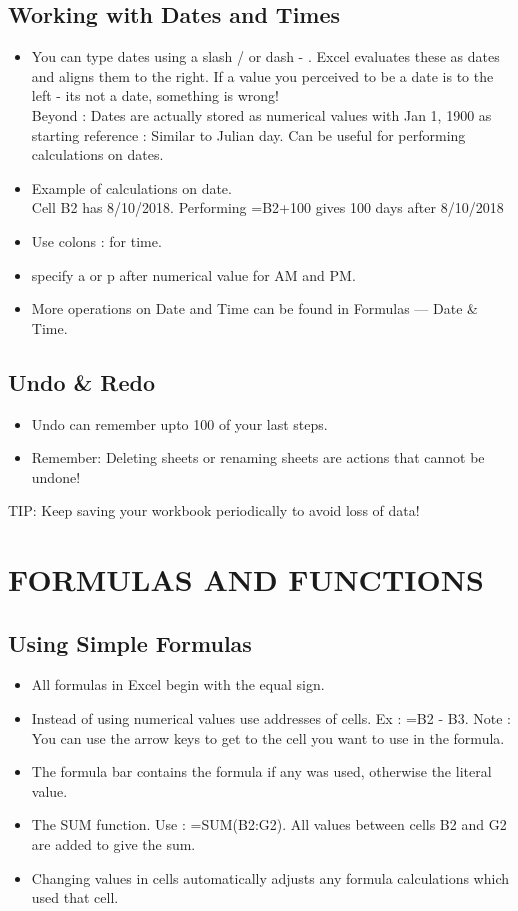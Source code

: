 \documentclass[11pt, oneside]{article}   	%
\begin{document}
\subsection{Working with Dates and Times}
\begin{itemize}
\item You can type dates using a slash / or dash - . Excel evaluates these as dates and aligns them to the right. If a value you perceived to be a date is to the left - its not a date, something is wrong!
\bigskip \\
 Beyond : Dates are actually stored as numerical values with Jan 1, 1900 as starting reference : Similar to Julian day. Can be useful for performing calculations on dates.
 \item Example of calculations on date. \\
 	Cell B2 has 8/10/2018. Performing =B2+100 gives 100 days after 8/10/2018 
\item Use colons : for time.
\item specify a or p after numerical value for AM and PM.
\item More operations on Date and Time can be found in Formulas --- Date \& Time.
\end{itemize}
\subsection{Undo \& Redo}
\begin{itemize}
\item Undo can remember upto 100 of your last steps.
\item Remember: Deleting sheets or renaming sheets are actions that cannot be undone!
\end{itemize}
TIP: Keep saving your workbook periodically to avoid loss of data!
\section{FORMULAS AND FUNCTIONS}
\subsection{Using Simple Formulas}
\begin{itemize}
\item All formulas in Excel begin with the equal sign.
\item Instead of using numerical values use addresses of cells. Ex : =B2 - B3.
Note : You can use the arrow keys to get to the cell you want to use in the formula. \\
\item The formula bar contains the formula if any was used, otherwise the literal value.
\item The SUM function. Use : =SUM(B2:G2). All values between cells B2 and G2 are added to give the sum.
\item Changing values in cells automatically adjusts any formula calculations which used that cell.
\end{itemize}
\end{document}
